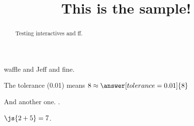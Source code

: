 \documentclass{ximera}
\title{This is the sample!}
\begin{document}
\begin{abstract}
Testing interactives and ff.
\end{abstract}

\maketitle

waffle and Jeff and fine.


 \begin{problem}
   The tolerance (0.01) means $8 \approx \answer[tolerance=0.01]{8}$

   \begin{feedback}[72]
   \end{feedback}
 \end{problem}

And another one.  .

$\js{2+5} = 7$.
\end{document}
